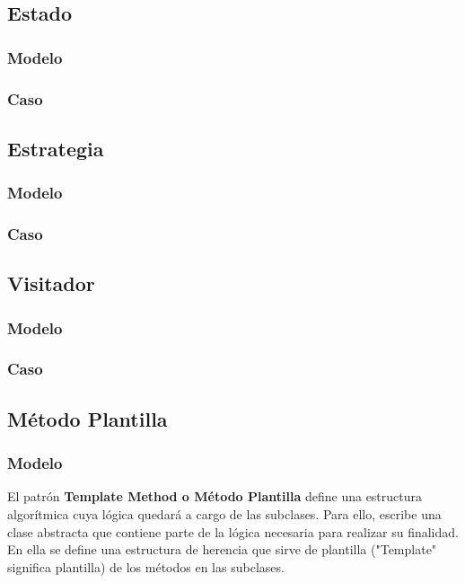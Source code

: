 \newpage

\subsection{Estado}
\subsubsection{Modelo}
\newpage
\subsubsection{Caso}
\newpage

\subsection{Estrategia}
\subsubsection{Modelo}
\newpage
\subsubsection{Caso}
\newpage

\subsection{Visitador}
\subsubsection{Modelo}
\newpage
\subsubsection{Caso}
\newpage

\subsection{Método Plantilla}
\subsubsection{Modelo}

El patrón \textbf{Template Method o Método Plantilla} define una estructura algorítmica cuya lógica quedará a cargo de las subclases. Para ello, escribe una clase abstracta que contiene parte de la lógica necesaria para realizar su finalidad. En ella se define una estructura de herencia que sirve de plantilla ("Template" significa plantilla) de los métodos en las subclases.

